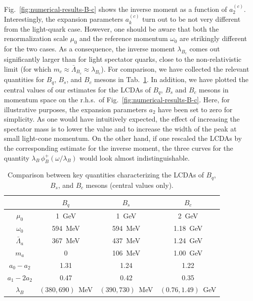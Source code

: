 \documentclass[a4paper,11pt]{article}
\begin{document}
Fig.~\ref{fig:numerical-results-B-c} shows the inverse moment as a function of $a^{(c)}_2$.
Interestingly, the expansion parameters $a_k^{(c)}$ turn out to be not very different from the light-quark case.
However, one should be aware that both the renormalization scale $\mu_0$ and the reference momentum $\omega_0$ 
are strikingly different for the two cases. As a consequence, the inverse moment $\lambda_{B_c}$ comes out significantly
larger than for light spectator quarks, close to the non-relativistic limit (for which $m_c \approx \bar\Lambda_{B_c} \approx \lambda_{B_c}$).
For comparison, we have collected the relevant quantities for $B_q$, $B_s$, and $B_c$ mesons in Tab.~\ref{tab:comp-q-s-c}.
In addition, we have plotted the central values of our estimates for the LCDAs of $B_q$, $B_s$ and $B_c$ mesons in momentum space
on the r.h.s.\ of Fig.~\ref{fig:numerical-results-B-c}. Here, for illustrative purposes, 
the expansion parameters $a_2$ have been set to zero for simplicity. As one would have intuitively expected, the effect of increasing the spectator mass is 
to lower the value and to increase the width of the peak at small light-cone momentum. On the other hand, if one rescaled the LCDAs by the corresponding 
estimate for the inverse moment, the three curves for the quantity $\lambda_B \, \phi_B^+(\omega/\lambda_B)$ would look almost indistinguishable.

\begin{table}[t!p]
\begin{center}
\begin{tabular}{|c || c | c || c |}
  \hline 
    & $B_q$ & $B_s$ & $B_c$ \\
    \hline \hline
    $\mu_0$  & 1~GeV & 1~GeV & 2~GeV \\
    $\omega_0$ &  594~MeV & 594~MeV &  1.18~GeV \\
    \hline 
    $\bar \Lambda_a$ & 367~MeV & 437~MeV & 1.24~GeV \\
    $ m_a$ & 0 & 106~MeV & 1.00~GeV \\
    \hline 
    $a_0-a_2$ & 1.31 & 1.24 &  1.22 
    \\
    $a_1-2a_2$ & 0.47 & 0.42 & 0.35
    \\
     \hline
    $\lambda_B$ & $(380, 690)$~MeV & $(390, 730)$~MeV & $(0.76, 1.49)$~GeV
    \\ \hline
  \end{tabular}
\end{center}
\caption{\label{tab:comp-q-s-c} Comparison between key quantities characterizing the LCDAs of $B_q$, $B_s$, and $B_c$ mesons (central values only).}
\end{table}
\end{document}

